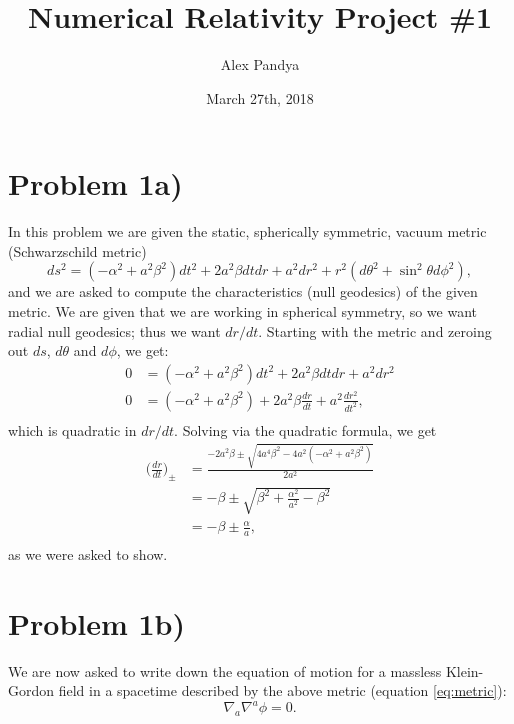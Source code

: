 \documentclass[12pt]{article}
\numberwithin{equation}{section}
\begin{document}
	\title{Numerical Relativity Project \#1}
	\author{Alex Pandya}
	\date{March 27th, 2018}
	\maketitle

\section{Problem 1a)}
In this problem we are given the static, spherically symmetric, vacuum metric (Schwarzschild metric)
\begin{equation} \label{eq:metric}
ds^2 = (-\alpha^2 + a^2 \beta^2) dt^2 + 2 a^2 \beta dt dr + a^2 dr^2 + r^2 (d\theta^2 + \sin^2 \theta d\phi^2),
\end{equation}
and we are asked to compute the characteristics (null geodesics) of the given metric.  We are given that we are working in spherical symmetry, so we want radial null geodesics; thus we want $dr/dt$.  Starting with the metric and zeroing out $ds$, $d\theta$ and $d\phi$, we get:
\begin{equation}
\begin{aligned}
0 &= (-\alpha^2 + a^2 \beta^2) dt^2 + 2 a^2 \beta dt dr + a^2 dr^2 \\
0 &= (-\alpha^2 + a^2 \beta^2) + 2 a^2 \beta \frac{dr}{dt} + a^2 \frac{dr^2}{dt^2}, \\
\end{aligned}
\end{equation}
which is quadratic in $dr/dt$.  Solving via the quadratic formula, we get
\begin{equation} \label{eq:c_plus_eqn}
\begin{aligned}
\Big(\frac{dr}{dt}\Big)_\pm &= \frac{-2 a^2 \beta \pm \sqrt{4 a^4 \beta^2 - 4 a^2 (-\alpha^2 + a^2 \beta^2)}}{2 a^2} \\
&= - \beta \pm \sqrt{\beta^2 + \frac{\alpha^2}{a^2} - \beta^2} \\
&= - \beta \pm \frac{\alpha}{a}, \\
\end{aligned}
\end{equation}
as we were asked to show.

\section{Problem 1b)}
We are now asked to write down the equation of motion for a massless Klein-Gordon field in a spacetime described by the above metric (equation \ref{eq:metric}):
\begin{equation} \label{eq:massless_KGE}
\nabla_a \nabla^a \phi = 0.
\end{equation}
\end{document}
